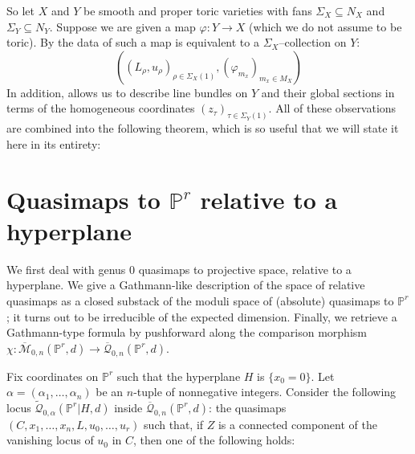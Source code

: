 \documentclass[11pt]{amsart}
\newcommand{\M}[4]{\overline{\mathcal M}_{#1,#2}(#3,#4)}
\newcommand{\Q}[4]{\overline{\mathcal Q}_{#1,#2}(#3,#4)}
\newcommand{\Qt}[4]{\widetilde{\mathcal Q}_{#1,#2}(#3,#4)}
\newcommand{\PP}{\mathbb P}
\renewcommand{\to}{\rightarrow}
\newcommand{\comp}{\chi}
\theoremstyle{plain}
\theoremstyle{definition}
\begin{document}
So let $X$ and $Y$ be smooth and proper toric varieties with fans $\Sigma_X \subseteq N_X$ and $\Sigma_Y \subseteq N_Y$. Suppose we are given a map $\varphi : Y \to X$ (which we do not assume to be toric). By \cite[Theorem 1.1]{CoxFunctor} the data of such a map is equivalent to a $\Sigma_X$--collection on $Y$:
\begin{equation*} ( (L_\rho, u_\rho)_{\rho \in \Sigma_X(1)}, (\varphi_{m_x})_{m_x \in M_X} ) \end{equation*}
In addition, \cite{CoxRing} allows us to describe line bundles on $Y$ and their global sections in terms of the homogeneous coordinates $(z_\tau)_{\tau \in \Sigma_Y(1)}$. All of these observations are combined into the following theorem, which is so useful that we will state it here in its entirety:






























\newpage
\section{Quasimaps to $\PP^r$ relative to a hyperplane}

We first deal with genus 0 quasimaps to projective space, relative to a hyperplane. We give a Gathmann-like description of the space of relative quasimaps as a closed substack of the moduli space of (absolute) quasimaps to $\PP^r$; it turns out to be irreducible of the expected dimension. Finally, we retrieve a Gathmann-type formula by pushforward along the comparison morphism $\comp\colon \M{0}{n}{\PP^r}{d}\to\Q{0}{n}{\PP^r}{d}$.

Fix coordinates on $\PP^r$ such that the hyperplane $H$ is $\{x_0=0\}$. Let $\alpha=(\alpha_1,\ldots,\alpha_n)$ be an $n$-tuple of nonnegative integers. Consider the following locus $\Qt{0}{\alpha}{\PP^r|H}{d}$ inside $\Q{0}{n}{\PP^r}{d}$: the quasimaps $(C,x_1,\ldots,x_n,L,u_0,\ldots,u_r)$ such that, if $Z$ is a connected component of the vanishing locus of $u_0$ in $C$, then one of the following holds:
\end{document}

